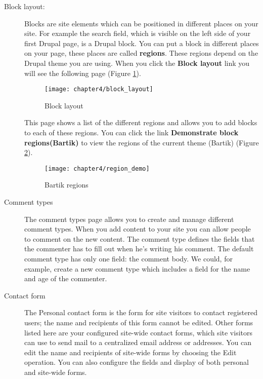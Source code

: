   \begin{description}
  	\item[Block layout:] Blocks are site elements which can be positioned in different places on your site. For example the search field, which is visible on the left side of your first Drupal page, is a Drupal block. You can put a block in different places on your page, these places are called \textbf{regions}. These regions depend on the Drupal theme you are using. 
  	When you click the \textbf{Block layout} link you will see the following page (Figure \ref{fig:block_layout}).
  	
  	\begin{figure}[H]
  		\centering
  		\texttt{[image: chapter4/block\_layout]}
  		\caption{Block layout}
  		\label{fig:block_layout}
  	\end{figure} 
  	
  	This page shows a list of the different regions and allows you to add blocks to each of these regions. You can click the link \textbf{Demonstrate block regions(Bartik)} to view the regions of the current theme (Bartik) (Figure \ref{fig:region_demo}).
  	
  	\begin{figure}[H]
  		\centering
  		\texttt{[image: chapter4/region\_demo]}
  		\caption{Bartik regions}
  		\label{fig:region_demo}
  	\end{figure} 
  	
  	
  	\item[Comment types] The comment types page allows you to create and manage different comment types. When you add content to your site you can allow people to comment on the new content. The comment type defines the fields that the commenter has to fill out when he's writing his comment. The default comment type has only one field: the comment body. We could, for example, create a new comment type which includes a field for the name and age of the commenter. 
  	
  	\item[Contact form] The Personal contact form is the form for site visitors to contact registered users; the name and recipients of this form cannot be edited. Other forms listed here are your configured site-wide contact forms, which site visitors can use to send mail to a centralized email address or addresses. You can edit the name and recipients of site-wide forms by choosing the Edit operation. You can also configure the fields and display of both personal and site-wide forms.
  	

\end{description}
